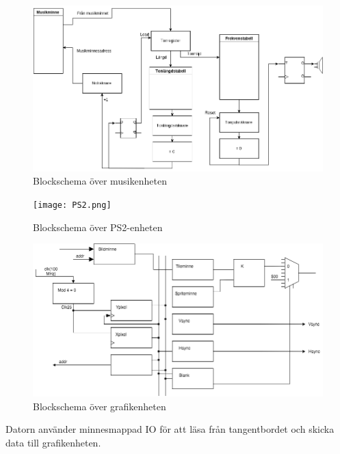 \documentclass[a4paper,titlepage]{article}
\begin{document}
\begin{figure}[H]
	\centering
\includegraphics[width=14cm]{Musik.png}
	\caption{Blockschema över musikenheten}
\end{figure}

\begin{figure}[H]
	\centering
\texttt{[image: PS2.png]}
	\caption{Blockschema över PS2-enheten}
\end{figure}

\begin{figure}[H]
	\centering
\includegraphics[width=14cm]{vga-schema.png}
	\caption{Blockschema över grafikenheten}
\end{figure}

Datorn använder minnesmappad IO för att läsa från tangentbordet och skicka data
till grafik\-enheten.
\end{document}
